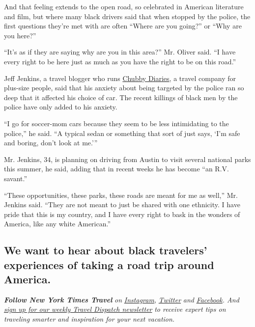 And that feeling extends to the open road, so celebrated in American
literature and film, but where many black drivers said that when stopped
by the police, the first questions they're met with are often ``Where
are you going?'' or ``Why are you here?''

``It's as if they are saying why are you in this area?'' Mr. Oliver
said. ``I have every right to be here just as much as you have the right
to be on this road.''

Jeff Jenkins, a travel blogger who runs
\href{https://www.chubbydiaries.com/}{Chubby Diaries}, a travel company
for plus-size people, said that his anxiety about being targeted by the
police ran so deep that it affected his choice of car. The recent
killings of black men by the police have only added to his anxiety.

``I go for soccer-mom cars because they seem to be less intimidating to
the police,'' he said. ``A typical sedan or something that sort of just
says, `I'm safe and boring, don't look at me.'''

Mr. Jenkins, 34, is planning on driving from Austin to visit several
national parks this summer, he said, adding that in recent weeks he has
become ``an R.V. savant.''

``These opportunities, these parks, these roads are meant for me as
well,'' Mr. Jenkins said. ``They are not meant to just be shared with
one ethnicity. I have pride that this is my country, and I have every
right to bask in the wonders of America, like any white American.''

\hypertarget{we-want-to-hear-about-black-travelers-experiences-of-taking-a-road-trip-around-america}{%
\subsection{We want to hear about black travelers' experiences of taking
a road trip around
America.}\label{we-want-to-hear-about-black-travelers-experiences-of-taking-a-road-trip-around-america}}

\emph{\textbf{Follow New York Times Travel}} \emph{on}
\href{https://www.instagram.com/nytimestravel/}{\emph{Instagram}}\emph{,}
\href{https://twitter.com/nytimestravel}{\emph{Twitter}} \emph{and}
\href{https://www.facebookcorewwwi.onion/nytimestravel/}{\emph{Facebook}}\emph{.
And}
\href{https://www.nytimes3xbfgragh.onion/newsletters/traveldispatch}{\emph{sign
up for our weekly Travel Dispatch newsletter}} \emph{to receive expert
tips on traveling smarter and inspiration for your next vacation.}

